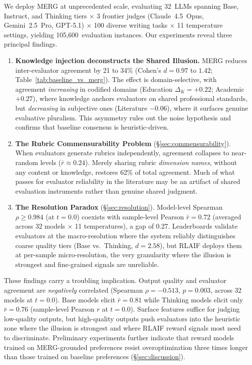 \documentclass{article}
\begin{document}
We deploy MERG at unprecedented scale, evaluating 32~LLMs spanning Base, Instruct, and Thinking tiers $\times$ 3 frontier judges (Claude~4.5~Opus, Gemini~2.5~Pro, GPT-5.1) $\times$ 100 diverse writing tasks $\times$ 11 temperature settings, yielding 105,600~evaluation instances. Our experiments reveal three principal findings.

\begin{enumerate}
    \item \textbf{Knowledge injection deconstructs the Shared Illusion.} MERG reduces inter-evaluator agreement by 21 to 34\% (Cohen's $d = 0.97$ to $1.42$; Table~\ref{tab:baseline_vs_merg}). The effect is domain-selective, with agreement \textit{increasing} in codified domains (Education $\Delta_K{=}+0.22$; Academic $+0.27$), where knowledge anchors evaluators on shared professional standards, but \textit{decreasing} in subjective ones (Literature $-0.06$), where it surfaces genuine evaluative pluralism. This asymmetry rules out the noise hypothesis and confirms that baseline consensus is heuristic-driven.

    \item \textbf{The Rubric Commensurability Problem} (\S\ref{sec:commensurability}). When evaluators generate rubrics independently, agreement collapses to near-random levels ($\bar{r} \approx 0.24$). Merely sharing rubric \textit{dimension names}, without any content or knowledge, restores 62\% of total agreement. Much of what passes for evaluator reliability in the literature may be an artifact of shared evaluation instruments rather than genuine shared judgment.

    \item \textbf{The Resolution Paradox} (\S\ref{sec:resolution}). Model-level Spearman $\rho \geq 0.984$ (at $t{=}0.0$) coexists with sample-level Pearson $\bar{r} = 0.72$ (averaged across 32 models $\times$ 11 temperatures), a gap of 0.27. Leaderboards validate evaluators at the macro-resolution where the system reliably distinguishes coarse quality tiers (Base vs.\ Thinking, $d = 2.58$), but RLAIF deploys them at per-sample micro-resolution, the very granularity where the illusion is strongest and fine-grained signals are unreliable.
\end{enumerate}

These findings carry a troubling implication. Output quality and evaluator agreement are \textit{negatively} correlated (Spearman $\rho = -0.513$, $p = 0.003$, across 32 models at $t{=}0.0$). Base models elicit $\bar{r} = 0.81$ while Thinking models elicit only $\bar{r} = 0.76$ (sample-level Pearson $r$ at $t{=}0.0$). Surface features suffice for judging low-quality outputs, but high-quality outputs push evaluators into the heuristic zone where the illusion is strongest and where RLAIF reward signals most need to discriminate. Preliminary experiments further indicate that reward models trained on MERG-grounded preferences resist overoptimization three times longer than those trained on baseline preferences (\S\ref{sec:discussion}).
\end{document}
